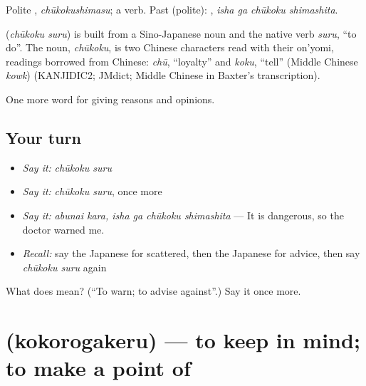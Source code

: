 Polite \textbf{}, \emph{chūkokushimasu}; a  verb. Past (polite): \textbf{ }, \emph{isha ga chūkoku shimashita}.

\begin{cousinweb}
\textbf{} (\emph{chūkoku suru}) is built from a Sino-Japanese noun and the native verb \emph{suru}, \textquotedblleft{}to do\textquotedblright{}. The noun, \emph{chūkoku}, is two Chinese characters read with their on'yomi, readings borrowed from Chinese: \emph{chū}, \textquotedblleft{}loyalty\textquotedblright{} and \emph{koku}, \textquotedblleft{}tell\textquotedblright{} (Middle Chinese \emph{kowk}) (KANJIDIC2; JMdict; Middle Chinese in Baxter's transcription).
\end{cousinweb}

\begin{grammarlens}[title={What you've built}]
One more word for giving reasons and opinions.
\end{grammarlens}

\subsection*{Your turn}
\begin{itemize}
\raggedright
  \item \emph{Say it:} \emph{chūkoku suru}
  \item \emph{Say it:} \emph{chūkoku suru}, once more
  \item \emph{Say it:} \emph{abunai kara, isha ga chūkoku shimashita} — It is dangerous, so the doctor warned me.
  \item \emph{Recall:} say the Japanese for scattered, then the Japanese for advice, then say \emph{chūkoku suru} again
\end{itemize}

\begin{tcolorbox}[breakable,colback=teal!4,colframe=teal!35!black,title={Before you move on}]
What does  mean? (\textquotedblleft{}To warn; to advise against\textquotedblright{}.) Say it once more.
\end{tcolorbox}
\section[\texorpdfstring{\ja{こころがける} (kokorogakeru)}{こころがける (kokorogakeru)}]{ (kokorogakeru) — to keep in mind; to make a point of}

